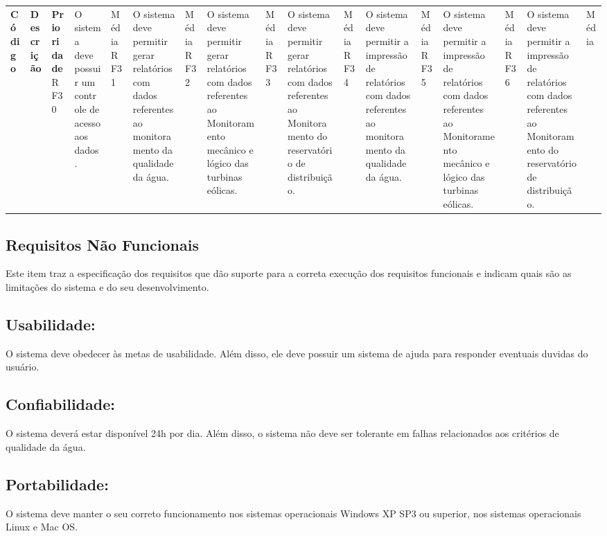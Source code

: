     \begin{longtable}{|m{3.0cm}|m{7.5cm}|m{3.5cm}|}
      \hline
\textbf{Código} & \textbf{Descrição} & \textbf{Prioridade}
\hline
RF30 & O sistema deve possuir um controle de acesso aos dados. & Média
\hline
RF31 & O sistema deve permitir gerar relatórios com dados referentes ao monitoramento da qualidade da água. & Média
\hline
RF32 & O sistema deve permitir gerar relatórios com dados referentes ao Monitoramento mecânico e lógico das turbinas eólicas. & Média
\hline
RF33 & O sistema deve permitir gerar relatórios com dados referentes ao Monitoramento do reservatório de distribuição. & Média
\hline
RF34 & O sistema deve permitir a impressão de relatórios com dados referentes ao monitoramento da qualidade da água. & Média
\hline
RF35 & O sistema deve permitir a impressão de relatórios com dados referentes ao Monitoramento mecânico e lógico das turbinas eólicas. & Média
\hline
RF36 & O  sistema deve permitir a impressão de relatórios com dados referentes ao Monitoramento do reservatório de distribuição. & Média
\hline

  \end{longtable}
  
  \subsection{Requisitos Não Funcionais}
  Este item traz a especificação dos requisitos que dão suporte para a correta execução dos requisitos funcionais e indicam quais são as limitações 
  do sistema e do seu desenvolvimento.
  
  \subsection{Usabilidade:}
  O sistema deve obedecer às metas de usabilidade. Além disso, ele deve possuir um sistema de ajuda para responder eventuais duvidas do usuário.
  
  \subsection{Confiabilidade:}
  O sistema deverá estar disponível 24h por dia. Além disso, o sistema não deve ser tolerante em falhas relacionados aos critérios de qualidade da água.

  \subsection{Portabilidade:}
  O sistema deve manter o seu correto funcionamento nos sistemas operacionais Windows XP SP3 ou superior, nos sistemas operacionais Linux e Mac OS.
	
